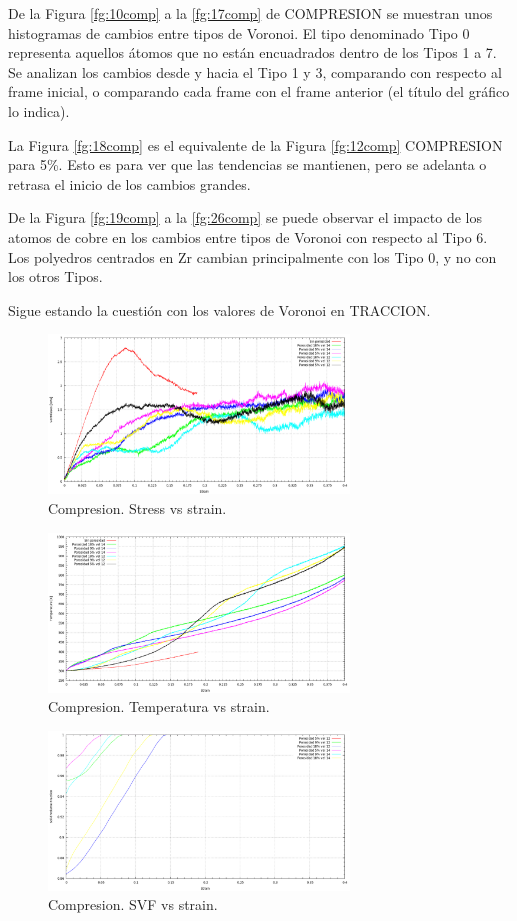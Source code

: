 \documentclass[10pt, oneside]{article} %
\begin{document}
De la Figura \ref{fg:10comp} a la \ref{fg:17comp} de COMPRESION se muestran unos histogramas de cambios entre tipos de Voronoi. El tipo denominado Tipo 0 representa aquellos átomos que no están encuadrados dentro de los Tipos 1 a 7. Se analizan los cambios desde y hacia el Tipo 1 y 3, comparando con respecto al frame inicial, o comparando cada frame con el frame anterior (el título del gráfico lo indica). 

La Figura \ref{fg:18comp} es el equivalente de la Figura \ref{fg:12comp} COMPRESION para 5\%. Esto es para ver que las tendencias se mantienen, pero se adelanta o retrasa el inicio de los cambios grandes.

De la Figura \ref{fg:19comp} a la \ref{fg:26comp} se puede observar el impacto de los atomos de cobre en los cambios entre tipos de Voronoi con respecto al Tipo 6. Los polyedros centrados en Zr cambian principalmente con los Tipo 0, y no con los otros Tipos.

Sigue estando la cuestión con los valores de Voronoi en TRACCION.

\begin{figure}[H]
\centering
\includegraphics[width=8cm]{Figures/Porosidad/Porosidad_VM_strain_2vel.png}
\caption{Compresion. Stress vs strain.}
\end{figure}

\begin{figure}[H]
\centering
\includegraphics[width=8cm]{Figures/Porosidad/Porosidad_temp_strain_2vel_comp.png}
\caption{Compresion. Temperatura vs strain.}
\end{figure}

\begin{figure}[H]
\centering
\includegraphics[width=8cm]{Figures/Porosidad/Porosidad_svf_strain_2vel_comp.png}
\caption{Compresion. SVF vs strain.}
\label{fg:3comp}
\end{figure}
\end{document}
